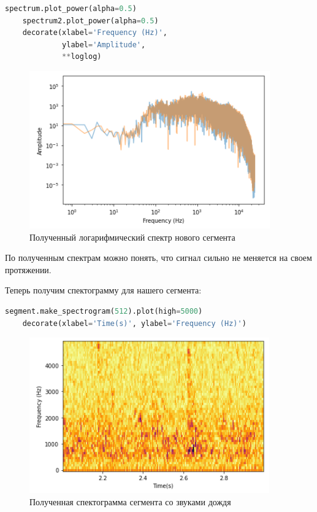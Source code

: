 \documentclass[a4paper]{article}
\begin{document}
\begin{lstlisting}[language=Python, caption= Получение логарифмиеского спектра нового сегмента]
    spectrum.plot_power(alpha=0.5)
    spectrum2.plot_power(alpha=0.5)
    decorate(xlabel='Frequency (Hz)',
             ylabel='Amplitude',
             **loglog)
\end{lstlisting}               
            
            \begin{figure}[H]
                \centering
                \includegraphics{ex_1_rain_second_log_spectr.png}
                \caption{Полученный логарифмический спектр нового сегмента}
                \label{fig:ex_1_rain_second_log_spectr}
            \end{figure}
            
            По полученным спектрам можно понять, что сигнал сильно не меняется на своем протяжении.
            
            Теперь получим спектограмму для нашего сегмента:
            
\begin{lstlisting}[language=Python, caption= Получение спектограммы для сегмента]
    segment.make_spectrogram(512).plot(high=5000)
    decorate(xlabel='Time(s)', ylabel='Frequency (Hz)')
\end{lstlisting}               
            
            \begin{figure}[H]
                \centering
                \includegraphics{ex_1_rain_spectogramma.png}
                \caption{Полученная спектограмма сегмента со звуками дождя}
                \label{fig:ex_1_rain_spectogramma}
            \end{figure}
            
\end{document}
